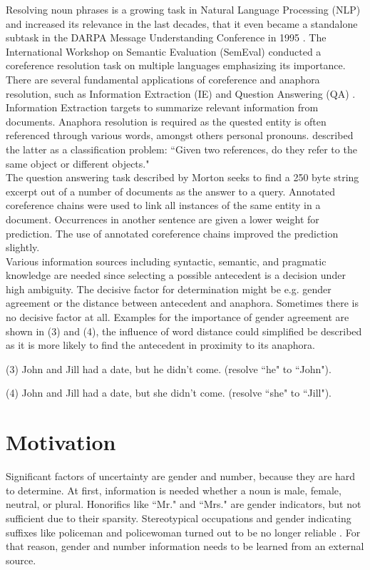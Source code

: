 Resolving noun phrases is a growing task in Natural Language Processing (NLP) and increased its relevance in the last decades, that it even became a standalone subtask in the DARPA Message Understanding Conference in 1995 \citep{chinchor1995message}. The International Workshop on Semantic Evaluation (SemEval) conducted a coreference resolution task on multiple languages \citep{recasens2010semeval} emphasizing its importance. 
There are several fundamental applications of coreference and anaphora resolution, such as Information Extraction (IE) \citep{mccarthy1995using} and Question Answering (QA) \citep{morton2000coreference}.\\ 
Information Extraction targets to summarize relevant information from documents. Anaphora resolution is required as the quested entity is often referenced through various words, amongst others personal pronouns. \citep{mccarthy1995using} described the latter as a classification problem: “Given two references, do they refer to the same object or different objects."\\
The question answering task described by Morton seeks to find a 250 byte string excerpt out of a number of documents as the answer to a query. Annotated coreference chains were used to link all instances of the same entity in a document. Occurrences in another sentence are given a lower weight for prediction. The use of annotated coreference chains improved the prediction slightly.\\
Various information sources including syntactic, semantic, and pragmatic knowledge are needed since selecting a possible antecedent is a decision under high ambiguity. The decisive factor for determination might be e.g. gender agreement or the distance between antecedent and anaphora. Sometimes there is no decisive factor at all. Examples for the importance of gender agreement are shown in (3) and (4), the influence of word distance could simplified be described as it is more likely to find the antecedent in proximity to its anaphora.

(3) John and Jill had a date, but he didn't come. (resolve “he" to “John").

(4) John and Jill had a date, but she didn't come. (resolve “she" to “Jill").


\section{Motivation}
Significant factors of uncertainty are gender and number, because they are hard to determine. At first, information is needed whether a noun is male, female, neutral, or plural. Honorifics like “Mr." and “Mrs." are gender indicators, but not sufficient due to their sparsity. Stereotypical occupations and gender indicating suffixes like policeman and policewoman turned out to be no longer reliable \citep{evans2000improving}. For that reason, gender and number information needs to be learned from an external source. 

